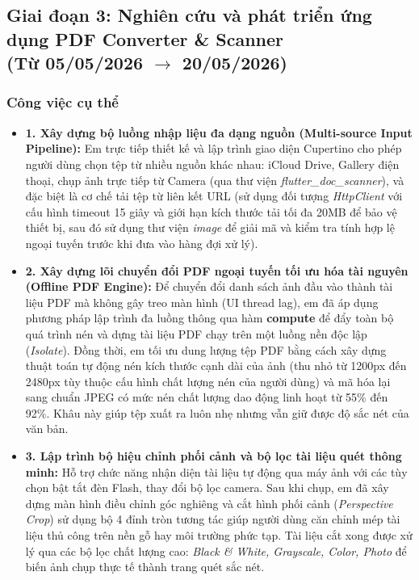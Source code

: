 \documentclass[12pt, a4paper]{article}
\begin{document}
\subsection[Giai đoạn 3: Nghiên cứu và phát triển ứng dụng PDF Converter \& Scanner (Từ 05/05/2026 đến 20/05/2026)]{Giai đoạn 3: Nghiên cứu và phát triển ứng dụng PDF Converter \& Scanner \\(Từ 05/05/2026 $\rightarrow$ 20/05/2026)}
\subsubsection{Công việc cụ thể}
\begin{itemize}
    \item \textbf{1. Xây dựng bộ luồng nhập liệu đa dạng nguồn (Multi-source Input Pipeline):}
    Em trực tiếp thiết kế và lập trình giao diện Cupertino cho phép người dùng chọn tệp từ nhiều nguồn khác nhau: iCloud Drive, Gallery điện thoại, chụp ảnh trực tiếp từ Camera (qua thư viện \textit{flutter\_doc\_scanner}), và đặc biệt là cơ chế tải tệp từ liên kết URL (sử dụng đối tượng \textit{HttpClient} với cấu hình timeout 15 giây và giới hạn kích thước tải tối đa 20MB để bảo vệ thiết bị, sau đó sử dụng thư viện \textit{image} để giải mã và kiểm tra tính hợp lệ ngoại tuyến trước khi đưa vào hàng đợi xử lý).

    \item \textbf{2. Xây dựng lõi chuyển đổi PDF ngoại tuyến tối ưu hóa tài nguyên (Offline PDF Engine):}
    Để chuyển đổi danh sách ảnh đầu vào thành tài liệu PDF mà không gây treo màn hình (UI thread lag), em đã áp dụng phương pháp lập trình đa luồng thông qua hàm \textbf{compute} để đẩy toàn bộ quá trình nén và dựng tài liệu PDF chạy trên một luồng nền độc lập (\textit{Isolate}). Đồng thời, em tối ưu dung lượng tệp PDF bằng cách xây dựng thuật toán tự động nén kích thước cạnh dài của ảnh (thu nhỏ từ 1200px đến 2480px tùy thuộc cấu hình chất lượng nén của người dùng) và mã hóa lại sang chuẩn JPEG có mức nén chất lượng dao động linh hoạt từ 55\% đến 92\%. Khâu này giúp tệp xuất ra luôn nhẹ nhưng vẫn giữ được độ sắc nét của văn bản.

    \item \textbf{3. Lập trình bộ hiệu chỉnh phối cảnh và bộ lọc tài liệu quét thông minh:}
    Hỗ trợ chức năng nhận diện tài liệu tự động qua máy ảnh với các tùy chọn bật tắt đèn Flash, thay đổi bộ lọc camera. Sau khi chụp, em đã xây dựng màn hình điều chỉnh góc nghiêng và cắt hình phối cảnh (\textit{Perspective Crop}) sử dụng bộ 4 đỉnh tròn tương tác giúp người dùng căn chỉnh mép tài liệu thủ công trên nền gỗ hay môi trường phức tạp. Tài liệu cắt xong được xử lý qua các bộ lọc chất lượng cao: \textit{Black \& White, Grayscale, Color, Photo} để biến ảnh chụp thực tế thành trang quét sắc nét.


\end{itemize}
\end{document}
